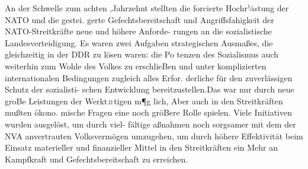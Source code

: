

An der Schwelle zum achten ,Jahrzehnt stellten die
forcierte Hochr¼stung der NATO und die gestei.
gerte Gefechtsbereitschaft und Angriffsfahigkeit
der NATO-Streitkräfte neue und höhere Anforde-
rungen an die sozialistische Landesverteidigung.
Es waren zwei Aufgaben strategischen Ausmaßes,
die gleichzeitig in der DDR zu lösen waren: die Po
tenzen des Sozialismus auch weiterhin zum Wohle
des Volkes zu erschlieBen und unter komplizierten
internationalen Bedingungen zugleich alles Erfor.
derliche für den zuverlässigen Schutz der sozialisti-
schen Entwicklung bereitzustellen.Das war nur
durch neue groBe Leistungen der Werkt¤tigen m¶g
lich, Aber auch in den Streitkräften mußten ökono.
mische Fragen eine noch gröBere Rolle spielen.
Viele Initiativen wurden ausgelöst, um durch viel-
fältige aßnahmen noch sorgsamer mit dem der
NVA anvertrauten Volksvermögen umzugehen, um
durch höhere Effektivität beim Einsatz materieller
und finanzieller Mittel in den Streitkräften ein
Mehr an Kampfkraft und Gefechtsbereitschaft zu
erreichen.

